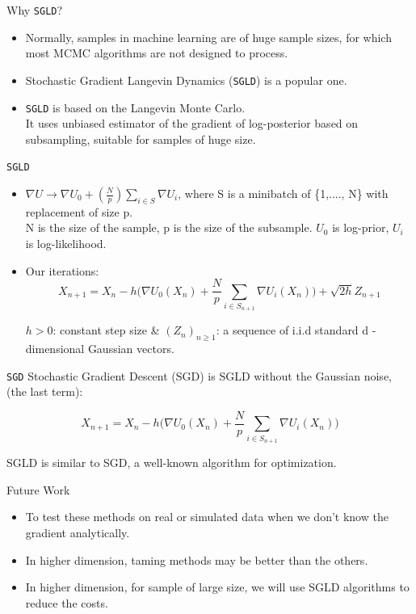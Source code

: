 \documentclass[aspectratio=169]{beamer}
\begin{document}
\begin{frame}{Why \texttt{SGLD}?}
  \begin{itemize}
      \item Normally, samples in machine learning are of huge sample sizes, for which most MCMC algorithms are not designed to process. 
      \item Stochastic Gradient Langevin Dynamics (\texttt{SGLD}) is a popular one. 
      \item \texttt{SGLD} is based on the Langevin Monte Carlo.\\
            It uses unbiased estimator of the gradient of log-posterior based on subsampling, suitable for samples of huge size. 
  \end{itemize} 
\end{frame}
\begin{frame}{\texttt{SGLD}}
\begin{itemize}
    \item $\nabla U \to \nabla U_0+(\frac{N}{p}) \sum_{i\in S}\nabla U_i$,  where S is a minibatch of \{1,...., N\} with replacement of size p.\\
    N is the size of the sample, p is the size of the subsample. 
    $U_0$ is log-prior, $U_i$ is log-likelihood.
\item Our iterations:
$$X_{n+1} = X_{n}-h \Bigg (\nabla U_0(X_n)+\frac{N}{p}\sum_{i\in S_{n+1}}\nabla U_i(X_n)\Bigg )+\sqrt{2h}Z_{n+1}$$

$h > 0$: constant step size & $(Z_n)_{n\geq1}$: a sequence of i.i.d standard d - dimensional Gaussian vectors. 
\end{itemize}
\end{frame}
\begin{frame}{\texttt{SGD}}
    Stochastic Gradient Descent (SGD) is SGLD without the Gaussian noise, (the last term):

$$X_{n+1} = X_{n}-h \Bigg (\nabla U_0(X_n)+\frac{N}{p}\sum_{i\in S_{n+1}}\nabla U_i(X_n)\Bigg)$$

SGLD is similar to SGD, a well-known algorithm for optimization. 
\end{frame}




\begin{frame}{Future Work}
\begin{itemize}
    \item To test these methods on  real or simulated data when we don't know the gradient analytically.
   \item In higher dimension, taming methods may be better than the others.
    \item In higher dimension, for sample of large size, we will use SGLD algorithms to reduce the costs.
\end{itemize}
\end{frame}
\end{document}
